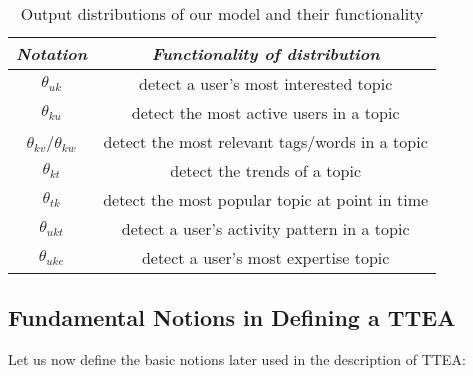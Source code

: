 \begin{table}[htp] 
\caption{Output distributions of our model and their functionality}
\label{tab:listofoutputs}
\centering
\begin{tabular}{|c|c|}
\hline
\emph{Notation}  & \emph{Functionality of distribution} \\ \hline
$\theta_{uk}$ & detect a user's most interested topic \\ \hline
$\theta_{ku}$ & detect the most active users in a topic \\ \hline
$\theta_{kv}$/$\theta_{kw}$ & detect the most relevant tags/words in a topic \\ \hline
$\theta_{kt}$ & detect the trends of a topic \\ \hline
$\theta_{tk}$ & detect the most popular topic at point in time \\ \hline
$\theta_{ukt}$ & detect a user's activity pattern in a topic \\ \hline
$\theta_{uke}$ & detect a user's most expertise topic\\ \hline
\end{tabular}
\end{table}

\subsection{Fundamental Notions in Defining a TTEA}
Let us now define the basic notions later used in the description of TTEA:

